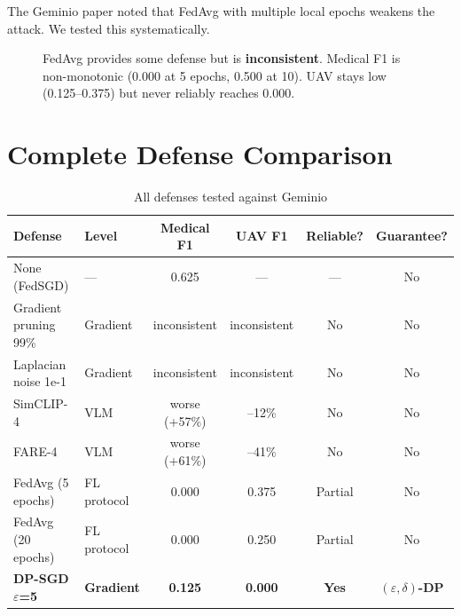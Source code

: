 \documentclass[11pt]{article}
\begin{document}
The Geminio paper noted that FedAvg with multiple local epochs weakens the attack. We tested this systematically.

\begin{figure}[h]
\centering
{}
\caption{FedAvg provides some defense but is \textbf{inconsistent}. Medical F1 is non-monotonic (0.000 at 5 epochs, 0.500 at 10). UAV stays low (0.125--0.375) but never reliably reaches 0.000.}
\end{figure}

\section{Complete Defense Comparison}

\begin{table}[h]
\centering
\caption{All defenses tested against Geminio}
\begin{tabular}{llcccc}
\toprule
\textbf{Defense} & \textbf{Level} & \textbf{Medical F1} & \textbf{UAV F1} & \textbf{Reliable?} & \textbf{Guarantee?} \\
\midrule
None (FedSGD) & --- & 0.625 & --- & --- & No \\
Gradient pruning 99\% & Gradient & inconsistent & inconsistent & No & No \\
Laplacian noise 1e-1 & Gradient & inconsistent & inconsistent & No & No \\
SimCLIP-4 & VLM & worse (+57\%) & --12\% & No & No \\
FARE-4 & VLM & worse (+61\%) & --41\% & No & No \\
FedAvg (5 epochs) & FL protocol & 0.000 & 0.375 & Partial & No \\
FedAvg (20 epochs) & FL protocol & 0.000 & 0.250 & Partial & No \\
\textbf{DP-SGD $\varepsilon$=5} & \textbf{Gradient} & \textbf{0.125} & \textbf{0.000} & \textbf{Yes} & \textbf{$(\varepsilon,\delta)$-DP} \\
\bottomrule
\end{tabular}
\end{table}
\end{document}
